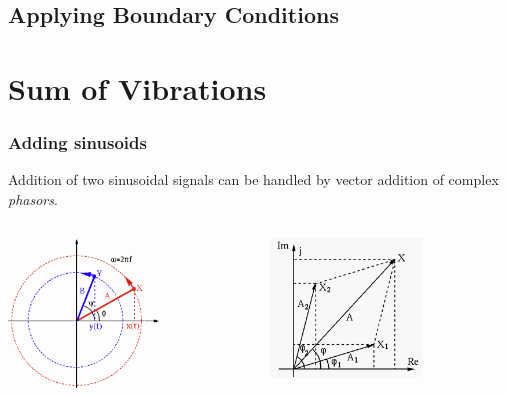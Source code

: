 \documentclass[pdf,hideothersubsections]{beamer}
\begin{document}
\subsection{Applying Boundary Conditions}



\section{Sum of Vibrations}
\begin{frame}
\frametitle{Adding sinusoids}
Addition of two sinusoidal signals can be handled by vector addition of complex \emph{phasors}.
\pause
\begin{columns}[T]
  \begin{column}{0.5\textwidth}
    \begin{centering}
      \includegraphics[width=4cm]{RotatingVectors2.png}
    \end{centering}
  \end{column}
  \pause
  \begin{column}{0.5\textwidth}
    \begin{centering}
      \includegraphics[width=4cm]{phasoraddition1a.png}
    \end{centering}
  \end{column}

\end{columns}

\end{frame}
\end{document}
